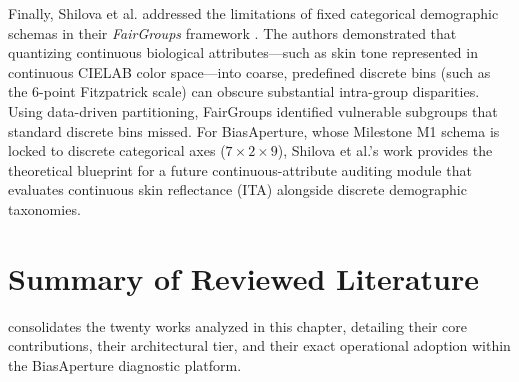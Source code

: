 Finally, Shilova et al. addressed the limitations of fixed categorical demographic schemas in their \emph{FairGroups} framework \cite{shilova2025fairgroups}. The authors demonstrated that quantizing continuous biological attributes---such as skin tone represented in continuous CIELAB color space---into coarse, predefined discrete bins (such as the 6-point Fitzpatrick scale) can obscure substantial intra-group disparities. Using data-driven partitioning, FairGroups identified vulnerable subgroups that standard discrete bins missed. For BiasAperture, whose Milestone M1 schema is locked to discrete categorical axes ($7 \times 2 \times 9$), Shilova et al.'s work provides the theoretical blueprint for a future continuous-attribute auditing module that evaluates continuous skin reflectance (ITA) alongside discrete demographic taxonomies.


\section{Summary of Reviewed Literature}
\label{sec:lit_summary}

 consolidates the twenty works analyzed in this chapter, detailing their core contributions, their architectural tier, and their exact operational adoption within the BiasAperture diagnostic platform.

